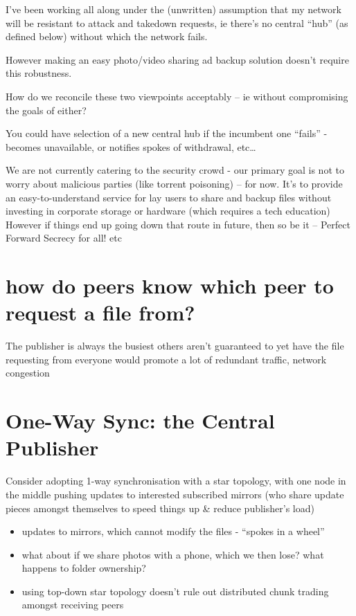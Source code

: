 \documentclass[12pt,a4paper,]{adreport}
\begin{document}
I've been working all along under the (unwritten) assumption that my
network will be resistant to attack and takedown requests, ie there's no
central ``hub'' (as defined below) without which the network fails.

However making an easy photo/video sharing ad backup solution doesn't
require this robustness.

How do we reconcile these two viewpoints acceptably -- ie without
compromising the goals of either?

You could have selection of a new central hub if the incumbent one
``fails'' - becomes unavailable, or notifies spokes of withdrawal,
etc\ldots{}

We are not currently catering to the security crowd - our primary goal
is not to worry about malicious parties (like torrent poisoning) -- for
now. It's to provide an easy-to-understand service for lay users to
share and backup files without investing in corporate storage or
hardware (which requires a tech education) However if things end up
going down that route in future, then so be it -- Perfect Forward
Secrecy for all! etc

\section{how do peers know which peer to request a file
from?}\label{how-do-peers-know-which-peer-to-request-a-file-from}

The publisher is always the busiest others aren't guaranteed to yet have
the file requesting from everyone would promote a lot of redundant
traffic, network congestion

\section{One-Way Sync: the Central
Publisher}\label{one-way-sync-the-central-publisher}

Consider adopting 1-way synchronisation with a star topology, with one
node in the middle pushing updates to interested subscribed mirrors (who
share update pieces amongst themselves to speed things up \& reduce
publisher's load)

\begin{itemize}
\itemsep1pt\parskip0pt
\item
  updates to mirrors, which cannot modify the files - ``spokes in a
  wheel''
\item
  what about if we share photos with a phone, which we then lose? what
  happens to folder ownership?
\item
  using top-down star topology doesn't rule out distributed chunk
  trading amongst receiving peers
\end{itemize}
\end{document}
